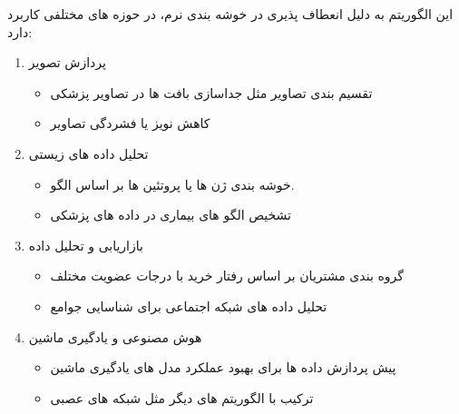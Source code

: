\documentclass[10pt]{beamer}
\begin{document}
\begin{frame}{}
\begin{footnotesize}
این الگوریتم به دلیل انعطاف پذیری در خوشه بندی نرم، در حوزه های مختلفی کاربرد دارد:
\begin{enumerate}
	\item
پردازش تصویر 
	\begin{itemize}
		\item تقسیم بندی تصاویر مثل جداسازی بافت ها در تصاویر پزشکی 
		\item کاهش نویز یا فشردگی تصاویر
	\end{itemize}
	\item 
تحلیل داده های زیستی 
	\begin{itemize}
		\item خوشه بندی ژن ها یا پروتئین ها بر اساس الگو.
		\item تشخیص الگو های بیماری در داده های پزشکی
	\end{itemize}
	\item بازاریابی و تحلیل داده 
	\begin{itemize}
		\item گروه بندی مشتریان بر اساس رفتار خرید با درجات عضویت مختلف 
		\item تحلیل داده های شبکه اجتماعی برای شناسایی جوامع
	\end{itemize}
\item هوش مصنوعی و یادگیری ماشین 
\begin{itemize}
	\item پیش پردازش داده ها برای بهبود عملکرد مدل های یادگیری ماشین 
	\item ترکیب با الگوریتم های دیگر مثل شبکه های عصبی
\end{itemize}
\end{enumerate}

	
\end{footnotesize}
\end{frame}
\end{document}

